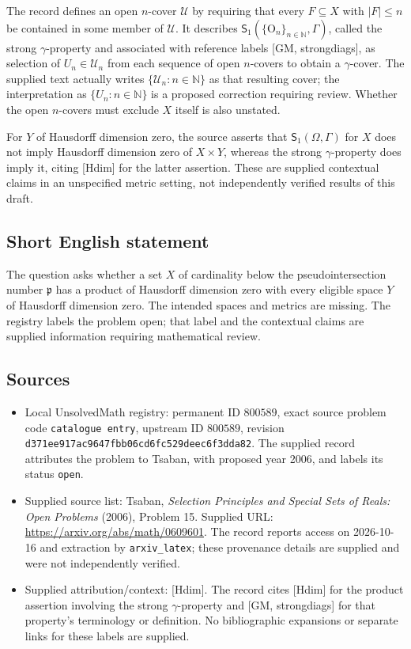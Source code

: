 \documentclass[11pt]{article}
\newcommand{\N}{\mathbb{N}}
\begin{document}
The record defines an open \(n\)-cover \(\mathcal U\) by requiring that every \(F\subseteq X\) with \(|F|\leq n\) be contained in some member of \(\mathcal U\). It describes \(\mathsf S_1(\{\mathrm O_n\}_{n\in\N},\Gamma)\), called the strong \(\gamma\)-property and associated with reference labels [GM, strongdiags], as selection of \(U_n\in\mathcal U_n\) from each sequence of open \(n\)-covers to obtain a \(\gamma\)-cover. The supplied text actually writes \(\{\mathcal U_n:n\in\N\}\) as that resulting cover; the interpretation as \(\{U_n:n\in\N\}\) is a proposed correction requiring review. Whether the open \(n\)-covers must exclude \(X\) itself is also unstated.

For \(Y\) of Hausdorff dimension zero, the source asserts that \(\mathsf S_1(\Omega,\Gamma)\) for \(X\) does not imply Hausdorff dimension zero of \(X\times Y\), whereas the strong \(\gamma\)-property does imply it, citing [Hdim] for the latter assertion. These are supplied contextual claims in an unspecified metric setting, not independently verified results of this draft.
\subsection{Short English statement}
The question asks whether a set \(X\) of cardinality below the pseudointersection number \(\mathfrak p\) has a product of Hausdorff dimension zero with every eligible space \(Y\) of Hausdorff dimension zero. The intended spaces and metrics are missing. The registry labels the problem open; that label and the contextual claims are supplied information requiring mathematical review.
\subsection{Sources}
\begin{itemize}
\item Local UnsolvedMath registry: permanent ID \(800589\), exact source problem code \texttt{catalogue entry}, upstream ID \(800589\), revision \texttt{d371ee917ac9647fbb06cd6fc529deec6f3dda82}. The supplied record attributes the problem to Tsaban, with proposed year 2006, and labels its status \texttt{open}.
\item Supplied source list: Tsaban, \emph{Selection Principles and Special Sets of Reals: Open Problems} (2006), Problem 15. Supplied URL: \url{https://arxiv.org/abs/math/0609601}. The record reports access on 2026-10-16 and extraction by \texttt{arxiv\_latex}; these provenance details are supplied and were not independently verified.
\item Supplied attribution/context: [Hdim]. The record cites [Hdim] for the product assertion involving the strong \(\gamma\)-property and [GM, strongdiags] for that property's terminology or definition. No bibliographic expansions or separate links for these labels are supplied.
\end{itemize}
\end{document}
